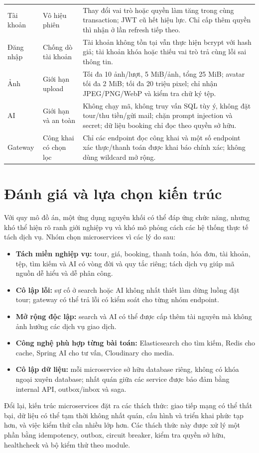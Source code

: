 \begin{longtable}{@{}L{3.2cm}L{5.4cm}L{6.3cm}@{}}
Tài khoản & Vô hiệu phiên & Thay đổi vai trò hoặc quyền làm tăng  trong cùng transaction; JWT cũ hết hiệu lực. Chỉ cấp thêm quyền thì nhận ở lần refresh tiếp theo.\\
Đăng nhập & Chống dò tài khoản & Tài khoản không tồn tại vẫn thực hiện bcrypt với hash giả; tài khoản khóa hoặc thiếu vai trò trả cùng lỗi sai thông tin.\\
Ảnh & Giới hạn upload & Tối đa 10 ảnh/lượt, 5 MiB/ảnh, tổng 25 MiB; avatar tối đa 2 MiB; tối đa 20 triệu pixel; chỉ nhận JPEG/PNG/WebP và kiểm tra chữ ký tệp.\\
AI & Giới hạn và an toàn & Không chạy mã, không truy vấn SQL tùy ý, không đặt tour/thu tiền/gửi mail; chặn prompt injection và secret; dữ liệu booking chỉ đọc theo quyền sở hữu.\\
Gateway & Công khai có chọn lọc & Chỉ các endpoint đọc công khai và một số endpoint xác thực/thanh toán được khai báo chính xác; không dùng wildcard mở rộng.\\
\end{longtable}

\section{Đánh giá và lựa chọn kiến trúc}
\label{sec:lua-chon-kien-truc}

Với quy mô đồ án, một ứng dụng nguyên khối có thể đáp ứng chức năng, nhưng khó thể hiện rõ ranh giới nghiệp vụ và khó mô phỏng cách các hệ thống thực tế tách dịch vụ. Nhóm chọn microservices vì các lý do sau:

\begin{itemize}
  \item \textbf{Tách miền nghiệp vụ:} tour, giá, booking, thanh toán, hóa đơn, tài khoản, tệp, tìm kiếm và AI có vòng đời và quy tắc riêng; tách dịch vụ giúp mã nguồn dễ hiểu và dễ phân công.
  \item \textbf{Cô lập lỗi:} sự cố ở search hoặc AI không nhất thiết làm dừng luồng đặt tour; gateway có thể trả lỗi có kiểm soát cho từng nhóm endpoint.
  \item \textbf{Mở rộng độc lập:} search và AI có thể được cấp thêm tài nguyên mà không ảnh hưởng các dịch vụ giao dịch.
  \item \textbf{Công nghệ phù hợp từng bài toán:} Elasticsearch cho tìm kiếm, Redis cho cache, Spring AI cho tư vấn, Cloudinary cho media.
  \item \textbf{Cô lập dữ liệu:} mỗi microservice sở hữu database riêng, không có khóa ngoại xuyên database; nhất quán giữa các service được bảo đảm bằng internal API, outbox/inbox và saga.
\end{itemize}

Đổi lại, kiến trúc microservices đặt ra các thách thức: giao tiếp mạng có thể thất bại, dữ liệu có thể tạm thời không nhất quán, cấu hình và triển khai phức tạp hơn, và việc kiểm thử cần nhiều lớp hơn. Các thách thức này được xử lý một phần bằng idempotency, outbox, circuit breaker, kiểm tra quyền sở hữu, healthcheck và bộ kiểm thử theo module.
